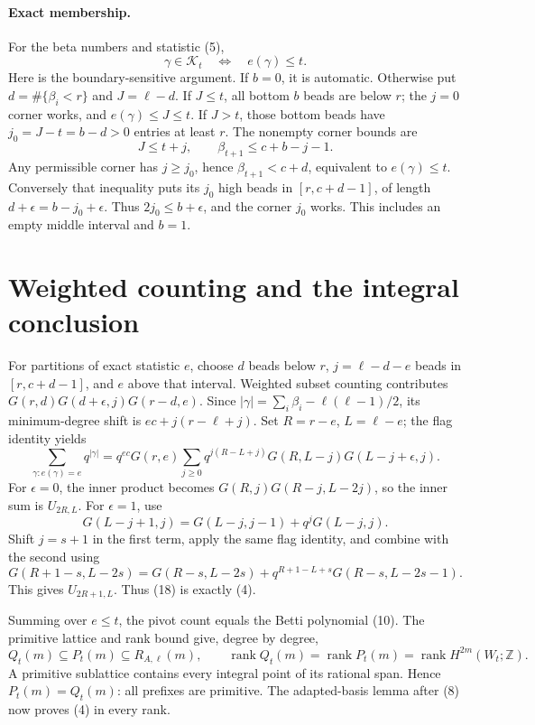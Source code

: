 \documentclass[11pt,letterpaper]{article}
\newcommand{\Z}{\mathbb Z}
\newcommand{\rank}{\operatorname{rank}}
\begin{document}
\paragraph{Exact membership.}
For the beta numbers and statistic (5),
\[
 \gamma\in\mathcal K_t\quad\Longleftrightarrow\quad e(\gamma)\le t.
 \tag{17}
\]
Here is the boundary-sensitive argument. If \(b=0\), it is automatic.
Otherwise put \(d=\#\{\beta_i<r\}\) and \(J=\ell-d\).
If \(J\le t\), all bottom \(b\) beads are below \(r\);
the \(j=0\) corner works, and \(e(\gamma)\le J\le t\).
If \(J>t\), those bottom beads have \(j_0=J-t=b-d>0\) entries
at least \(r\). The nonempty corner bounds are
\[
 J\le t+j,\qquad \beta_{t+1}\le c+b-j-1.
\]
Any permissible corner has \(j\ge j_0\), hence
\(\beta_{t+1}<c+d\), equivalent to \(e(\gamma)\le t\).
Conversely that inequality puts its \(j_0\) high beads in
\([r,c+d-1]\), of length \(d+\epsilon=b-j_0+\epsilon\).
Thus \(2j_0\le b+\epsilon\), and the corner \(j_0\) works.
This includes an empty middle interval and \(b=1\).

\newpage
\section{Weighted counting and the integral conclusion}
For partitions of exact statistic \(e\), choose \(d\) beads below \(r\),
\(j=\ell-d-e\) beads in \([r,c+d-1]\), and \(e\) above that interval.
Weighted subset counting contributes
\(G(r,d)G(d+\epsilon,j)G(r-d,e)\).
Since \(|\gamma|=\sum_i\beta_i-\ell(\ell-1)/2\), its minimum-degree
shift is \(ec+j(r-\ell+j)\).
Set \(R=r-e\), \(L=\ell-e\); the flag identity yields
\[
 \sum_{\gamma:e(\gamma)=e}q^{|\gamma|}
 =q^{ec}G(r,e)
   \sum_{j\ge0}q^{j(R-L+j)}
             G(R,L-j)G(L-j+\epsilon,j).
 \tag{18}
\]
For \(\epsilon=0\), the inner product becomes
\(G(R,j)G(R-j,L-2j)\), so the inner sum is \(U_{2R,L}\).
For \(\epsilon=1\), use
\[
 G(L-j+1,j)=G(L-j,j-1)+q^jG(L-j,j).
\]
Shift \(j=s+1\) in the first term, apply the same flag identity,
and combine with the second using
\[
 G(R+1-s,L-2s)=G(R-s,L-2s)
       +q^{R+1-L+s}G(R-s,L-2s-1).
\]
This gives \(U_{2R+1,L}\). Thus (18) is exactly (4).

Summing over \(e\le t\), the pivot count equals the Betti polynomial
(10). The primitive lattice and rank bound give, degree by degree,
\[
 Q_t(m)\subseteq P_t(m)\subseteq R_{A,\ell}(m),\qquad
 \rank Q_t(m)=\rank P_t(m)=\rank H^{2m}(W_t;\Z).
\]
A primitive sublattice contains every integral point of its rational
span. Hence \(P_t(m)=Q_t(m)\): all prefixes are primitive.
The adapted-basis lemma after (8) now proves (4) in every rank.
\end{document}
